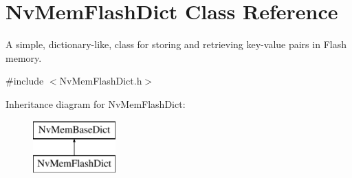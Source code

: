\hypertarget{class_nv_mem_flash_dict}{}\section{Nv\+Mem\+Flash\+Dict Class Reference}
\label{class_nv_mem_flash_dict}


A simple, dictionary-\/like, class for storing and retrieving key-\/value pairs in Flash memory.  




{\ttfamily \#include $<$Nv\+Mem\+Flash\+Dict.\+h$>$}

Inheritance diagram for Nv\+Mem\+Flash\+Dict\+:\begin{figure}[H]
\begin{center}
\leavevmode
\includegraphics[height=2.000000cm]{class_nv_mem_flash_dict}
\end{center}
\end{figure}
